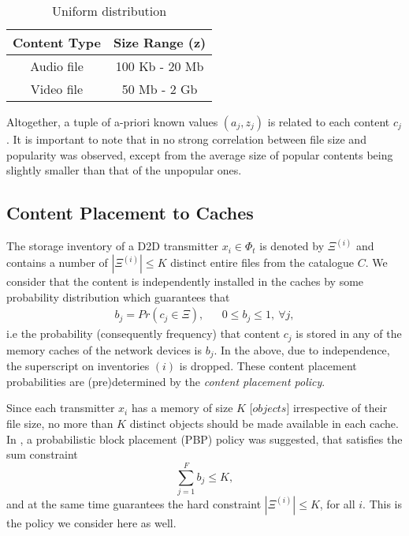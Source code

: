 \documentclass[conference]{IEEEtran}
\begin{document}
\begin{table}[h!]
\caption{Uniform distribution}
\vspace{+0.5cm}
 \centering
 \normalsize
\begin{tabular}{|c|c|}
 \hline
 Content Type & Size Range (z)\\ [1 ex]\hline
  Audio file & 100 Kb - 20 Mb \\ [0.5 ex]\hline
 Video file  & 50 Mb - 2 Gb \\ [0.5 ex]\hline
\end{tabular}
\label{Tab1}
\end{table}





Altogether, a tuple of a-priori known values $(a_j,z_j)$ is related to each content  $c_j$. It is important to note that in \cite{BreslauINFO99} no strong correlation between file size and popularity was observed, except from the average size of popular contents being slightly smaller than that of the unpopular ones. 

\subsection{Content Placement to Caches}

The storage inventory of a D2D transmitter $x_{i}\in\Phi_t$ is denoted by $\Xi^{(i)}$ and contains a number of $|\Xi^{(i)}|\leq K$ distinct entire files from the catalogue \textit{$C$}. We consider that the content is independently installed in the caches by some probability distribution which guarantees that
	\begin{eqnarray}
	\label{bj}
    		b_j = Pr(c_j \in \Xi), & & 0\leq b_j \leq 1 , \ \forall {j},
     	\end{eqnarray}
i.e the probability (consequently frequency) that content \textit{$c_j$} is stored in any of the memory caches of the network devices is \textit{$b_j$}. In the above, due to independence, the superscript on inventories $(i)$ is dropped. These content placement probabilities are (pre)determined by the \textit{content placement policy}.

Since each transmitter $x_i$ has a memory of size $K$ [$objects$] irrespective of their file size, no more than $K$ distinct objects should be made available in each cache. In \cite{BlaGioICC15}, a probabilistic block placement (PBP) policy was suggested, that satisfies the sum constraint 
\begin{equation}
\label{probbjK}
\sum_{j=1}^{F} b_j \leq K,
\end{equation}
and at the same time guarantees the hard constraint $|\Xi^{(i)}| \leq K$, for all $i$. This is the policy we consider here as well.
\end{document}
